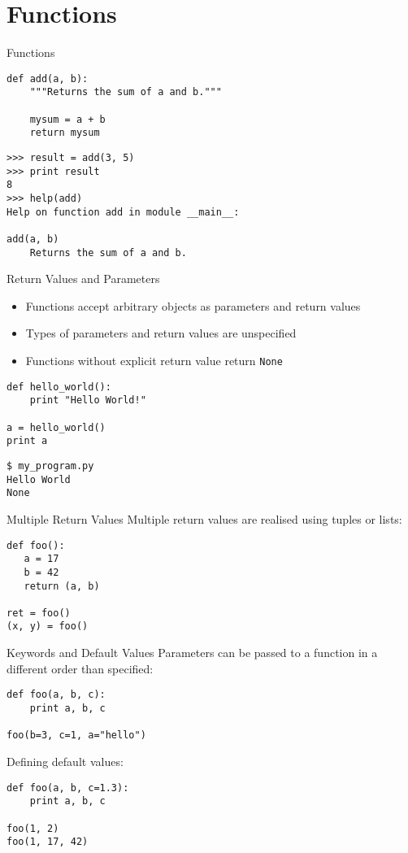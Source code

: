 \section{Functions}

\begin{frame}[fragile]{Functions}
\begin{lstlisting}[style=Python]
def add(a, b):
    """Returns the sum of a and b."""

    mysum = a + b
    return mysum
\end{lstlisting}

\begin{lstlisting}[style=Shell]
>>> result = add(3, 5)
>>> print result
8
>>> help(add)
Help on function add in module __main__:

add(a, b)
    Returns the sum of a and b.
\end{lstlisting}
\end{frame}

\begin{frame}[fragile]{Return Values and Parameters}
\begin{itemize}
\item Functions accept arbitrary objects as parameters and return values
\item Types of parameters and return values are unspecified
\item Functions without explicit return value return \lstinline{None}
\end{itemize}
\begin{lstlisting}[style=Python]
def hello_world():
    print "Hello World!"

a = hello_world()
print a
\end{lstlisting}
\begin{lstlisting}[style=Shell]
$ my_program.py
Hello World
None
\end{lstlisting} %
\end{frame}

\begin{frame}[fragile]{Multiple Return Values}
Multiple return values are realised using tuples or lists:
\begin{lstlisting}[style=Python]
def foo():
   a = 17
   b = 42
   return (a, b)

ret = foo()
(x, y) = foo()
\end{lstlisting}
\end{frame}

\begin{frame}[fragile]{Keywords and Default Values}
Parameters can be passed to a function in a different order than specified:
\begin{lstlisting}[style=Python]
def foo(a, b, c):
    print a, b, c

foo(b=3, c=1, a="hello")
\end{lstlisting}
Defining default values:
\begin{lstlisting}[style=Python]
def foo(a, b, c=1.3):
    print a, b, c

foo(1, 2)
foo(1, 17, 42)
\end{lstlisting}
\end{frame}

